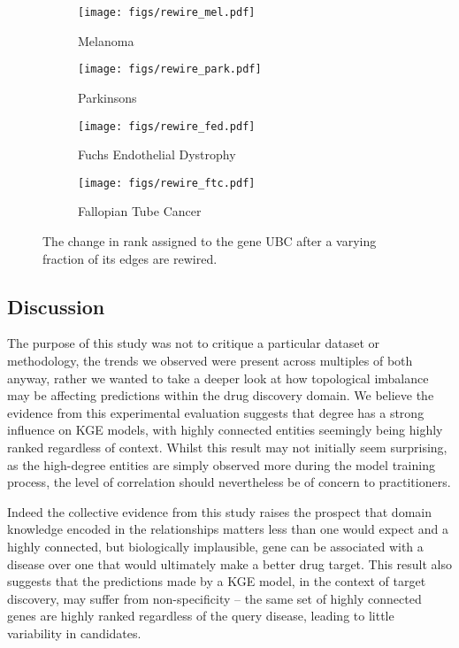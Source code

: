 \begin{figure*}[!ht]
	\centering
	\begin{subfigure}[b]{0.48\textwidth}
		\centering
		\texttt{[image: figs/rewire\_mel.pdf]}
		\caption{Melanoma}\label{fig:rewire:mel}
	\end{subfigure}
	\begin{subfigure}[b]{0.48\textwidth}
		\centering
		\texttt{[image: figs/rewire\_park.pdf]}
		\caption{Parkinsons}\label{fig:rewire:park}
	\end{subfigure}

	\begin{subfigure}[b]{0.48\textwidth}
		\centering
		\texttt{[image: figs/rewire\_fed.pdf]}
		\caption{Fuchs Endothelial Dystrophy}\label{fig:rewire:fuchs}
	\end{subfigure}
	\begin{subfigure}[b]{0.48\textwidth}
		\centering
		\texttt{[image: figs/rewire\_ftc.pdf]}
		\caption{Fallopian Tube Cancer}\label{fig:rewire:fal}
	\end{subfigure}
	\caption{The change in rank assigned to the gene UBC after a varying fraction of its edges are rewired.}
	\label{fig:rewire}
\end{figure*}

\subsection{Discussion}

The purpose of this study was not to critique a particular dataset or methodology, the trends we observed were present across multiples of both anyway, rather we wanted to take a deeper look at how topological imbalance may be affecting predictions within the drug discovery domain. We believe the evidence from this experimental evaluation suggests that degree has a strong influence on KGE models, with highly connected entities seemingly being highly ranked regardless of context. Whilst this result may not initially seem surprising, as the high-degree entities are simply observed more during the model training process, the level of correlation should nevertheless be of concern to practitioners.

Indeed the collective evidence from this study raises the prospect that domain knowledge encoded in the relationships matters less than one would expect and a highly connected, but biologically implausible, gene can be associated with a disease over one that would ultimately make a better drug target. This result also suggests that the predictions made by a KGE model, in the context of target discovery, may suffer from non-specificity -- the same set of highly connected genes are highly ranked regardless of the query disease, leading to little variability in candidates.

